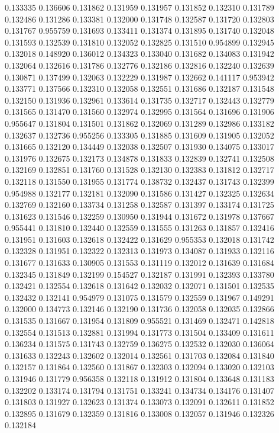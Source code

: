 0.133335
0.136606
0.131862
0.131959
0.131957
0.131852
0.132310
0.131789
0.132486
0.131286
0.133381
0.132000
0.131748
0.132587
0.131720
0.132803
0.131767
0.955759
0.131693
0.133411
0.131374
0.131895
0.131740
0.132048
0.131593
0.132539
0.131810
0.132052
0.132825
0.131510
0.954899
0.132945
0.132018
0.148920
0.136012
0.134323
0.133040
0.131682
0.134083
0.131942
0.132064
0.132616
0.131786
0.132776
0.132186
0.132816
0.132240
0.132639
0.130871
0.137499
0.132063
0.132229
0.131987
0.132662
0.141117
0.953942
0.133771
0.137566
0.132310
0.132058
0.132551
0.131686
0.132187
0.131548
0.132150
0.131936
0.132961
0.133614
0.131735
0.132717
0.132443
0.132779
0.131565
0.131470
0.131560
0.132974
0.132995
0.131564
0.131696
0.131906
0.955647
0.131804
0.131501
0.131862
0.132069
0.131289
0.132986
0.133182
0.132637
0.132736
0.955256
0.133305
0.131885
0.131609
0.131905
0.132052
0.131665
0.132120
0.134449
0.132038
0.132507
0.131930
0.134075
0.133017
0.131976
0.132675
0.132173
0.134878
0.131833
0.132839
0.132741
0.132508
0.132169
0.132851
0.131760
0.131528
0.132130
0.132383
0.131812
0.132717
0.132118
0.131550
0.131955
0.131774
0.138732
0.132437
0.131743
0.132399
0.954988
0.132177
0.132181
0.132090
0.131586
0.131427
0.132325
0.132634
0.132769
0.132160
0.133734
0.131258
0.132587
0.131397
0.133174
0.131725
0.131623
0.131546
0.132259
0.130950
0.131944
0.131672
0.131978
0.137667
0.955441
0.131810
0.132440
0.132559
0.131555
0.131263
0.131857
0.132416
0.131951
0.131603
0.132618
0.132422
0.131629
0.955353
0.132018
0.131742
0.132328
0.131951
0.132322
0.132313
0.131973
0.134087
0.131933
0.132116
0.131677
0.131633
0.130905
0.131553
0.131119
0.132012
0.131639
0.131684
0.132345
0.131849
0.132199
0.154527
0.132187
0.131991
0.132393
0.133780
0.132421
0.132554
0.132618
0.131642
0.132032
0.132071
0.131501
0.132535
0.132432
0.132141
0.954979
0.131075
0.131579
0.132559
0.131967
0.149291
0.132000
0.134773
0.132146
0.132190
0.131736
0.132058
0.132035
0.132866
0.131535
0.131667
0.131954
0.131809
0.955521
0.131469
0.132471
0.142818
0.132554
0.131513
0.132881
0.131994
0.131773
0.131504
0.133409
0.131611
0.136234
0.131575
0.131743
0.132759
0.136275
0.132532
0.132030
0.136064
0.131633
0.132243
0.132602
0.132014
0.132561
0.131703
0.132084
0.131840
0.132157
0.131864
0.132560
0.131867
0.132303
0.132094
0.133020
0.132103
0.131946
0.131779
0.956358
0.132118
0.131912
0.131804
0.133648
0.131183
0.132202
0.133174
0.131794
0.131751
0.133241
0.134734
0.134176
0.131407
0.131803
0.131927
0.132623
0.131374
0.133073
0.132091
0.132611
0.131852
0.132895
0.131679
0.132359
0.131816
0.133008
0.132057
0.131946
0.132326
0.132184
